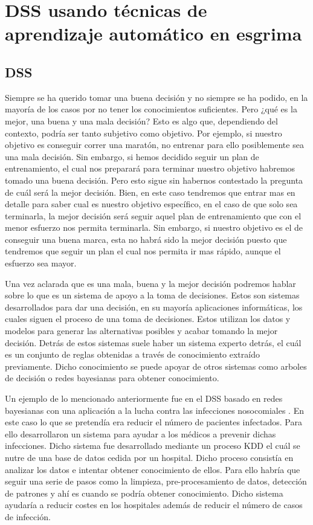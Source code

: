 \newline

\section{\acs{DSS} usando técnicas de aprendizaje automático en esgrima}
\subsection{\acl{DSS}}

Siempre se ha querido tomar una buena decisión y no siempre se ha podido, en la mayoría de los casos
 por no tener los conocimientos suficientes. Pero ¿qué es la mejor, una buena y una mala decisión?
 Esto es algo que, dependiendo del contexto, podría ser tanto subjetivo como objetivo. Por ejemplo, si nuestro
 objetivo es conseguir correr una maratón, no entrenar para ello posiblemente sea una mala decisión.
 Sin embargo, si hemos decidido seguir un plan de entrenamiento, el cual nos preparará para terminar
 nuestro objetivo habremos tomado una buena decisión. Pero esto sigue sin habernos contestado la pregunta
 de cuál será la mejor decisión. Bien, en este caso tendremos que entrar mas en detalle para saber
 cual es nuestro objetivo específico, en el caso de que solo sea terminarla, la mejor decisión será seguir aquel
 plan de entrenamiento que con el menor esfuerzo nos permita terminarla. Sin embargo, si nuestro objetivo
 es el de conseguir una buena marca, esta no habrá sido la mejor decisión puesto que tendremos que
 seguir un plan el cual nos permita ir mas rápido, aunque el esfuerzo sea mayor.

Una vez aclarada que es una mala, buena y la mejor decisión podremos hablar sobre lo que es un sistema
 de apoyo a la toma de decisiones. Estos son sistemas desarrollados para dar una decisión, en su mayoría
 aplicaciones informáticas, los cuales siguen el proceso de una toma de decisiones. Estos utilizan
 los datos y modelos para generar las alternativas posibles y acabar tomando la mejor decisión. Detrás
 de estos sistemas suele haber un sistema experto detrás, el cuál es un conjunto de reglas obtenidas
 a través de conocimiento extraído previamente. Dicho conocimiento se puede apoyar de otros sistemas como
 arboles de decisión o redes bayesianas para obtener conocimiento.

Un ejemplo de lo mencionado anteriormente fue en el \acs{DSS} basado en redes bayesianas con una aplicación
 a la lucha contra las infecciones nosocomiales \cite{hela}. En este caso lo que se pretendía
 era reducir el número de pacientes infectados. Para ello desarrollaron un sistema para ayudar a los
 médicos a prevenir dichas infecciones. Dicho sistema fue desarrollado mediante un proceso \acf{KDD} el
 cuál se nutre de una base de datos cedida por un hospital. Dicho proceso consistía en analizar los datos
 e intentar obtener conocimiento de ellos. Para ello habría que seguir una serie de pasos como la
 limpieza, pre-procesamiento de datos, detección de patrones y ahí es cuando se podría obtener conocimiento.
 Dicho sistema ayudaría a reducir costes en los hospitales además de reducir el número de casos de infección.

